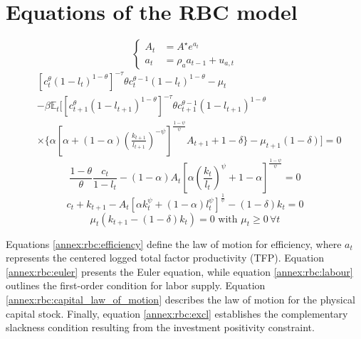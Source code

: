 \documentclass[a4paper,11pt]{amsart}
\begin{document}
\setcounter{equation}{0}
\renewcommand{\theequation}{\thesection.\arabic{equation}}


\section{Equations of the RBC model}\label{appendix:rbc}
\setcounter{equation}{0}

\begin{equation}
   \label{annex:rbc:efficiency}
   \begin{cases}
      A_t & = A^{\star}e^{a_t}         \\
      a_t & = \rho_a a_{t-1} + u_{a,t}
   \end{cases}
\end{equation}
\begin{equation}
   \label{annex:rbc:euler}
   \begin{split}
       & \left[c_t^{\theta}(1-l_t)^{1-\theta}\right]^{-\tau}\theta c_t^{\theta-1}(1-l_t)^{1-\theta}-\mu_t                                                                              \\ &-
      \beta \mathbb E_t \Biggl[\left[c_{t+1}^{\theta}(1-l_{t+1})^{1-\theta}\right]^{-\tau}\theta c_{t+1}^{\theta-1}(1-l_{t+1})^{1-\theta}                                              \\
       & \times \Biggl\{\alpha \left[\alpha+(1-\alpha)\left(\frac{k_{t+1}}{l_{t+1}}\right)^{-\psi}\right]^{\frac{1-\psi}{\psi}}A_{t+1}+1-\delta\Biggr\}-\mu_{t+1}(1-\delta)\Biggr] = 0
   \end{split}
\end{equation}
\begin{equation}
   \label{annex:rbc:labour}
   \frac{1-\theta}{ \theta}\frac{c_t}{1-l_t} - (1-\alpha)A_t\left[\alpha \left(\frac{k_t}{l_t}\right)^{\psi}+1-\alpha\right]^{\frac{1-\psi}{\psi}} = 0
\end{equation}
\begin{equation}
   \label{annex:rbc:capital_law_of_motion}
   c_t + k_{t+1} - A_t\left[\alpha k_t^{\psi} + (1-\alpha) l_t^{\psi}\right]^{\frac{1}{\psi}}- (1-\delta)k_t = 0
\end{equation}
\begin{equation}
   \label{annex:rbc:excl}
   \mu_t \left(k_{t+1}-(1-\delta)k_t\right) = 0\text{ with }\mu_t\geq 0 \, \forall t
\end{equation}
\newline

Equations \eqref{annex:rbc:efficiency} define the law of motion for
efficiency, where \( a_t \) represents the centered logged total
factor productivity (TFP). Equation \eqref{annex:rbc:euler} presents
the Euler equation, while equation \eqref{annex:rbc:labour} outlines
the first-order condition for labor supply. Equation
\eqref{annex:rbc:capital_law_of_motion} describes the law of motion
for the physical capital stock. Finally, equation
\eqref{annex:rbc:excl} establishes the complementary slackness
condition resulting from the investment positivity constraint.\newline
\end{document}
